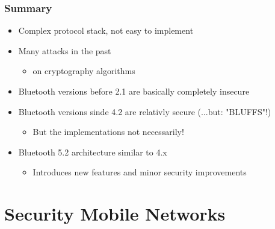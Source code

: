 \subsubsection{Summary}
\begin{itemize}
  \item Complex protocol stack, not easy to implement
  \item Many attacks in the past  
    \begin{itemize}
      \item on cryptography algorithms
    \end{itemize}
  \item Bluetooth versions before 2.1 are basically completely insecure 
  \item Bluetooth versions sinde 4.2 are relativly secure (...but: "BLUFFS"!) 
    \begin{itemize}
      \item But the implementations not necessarily!
    \end{itemize}
  \item Bluetooth 5.2 architecture similar to 4.x 
    \begin{itemize}
      \item Introduces new features and minor security improvements
    \end{itemize}
\end{itemize}

\section{Security Mobile Networks}

